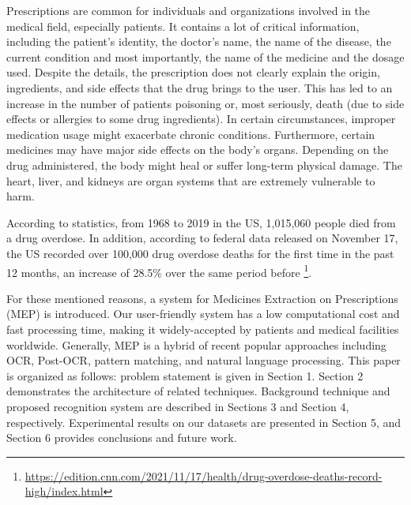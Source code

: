 Prescriptions are common for individuals and organizations involved in the medical field, especially patients. It contains a lot of critical information, including the patient's identity, the doctor's name, the name of the disease, the current condition and most importantly, the name of the medicine and the dosage used. Despite the details, the prescription does not clearly explain the origin, ingredients, and side effects that the drug brings to the user. This has led to an increase in the number of patients poisoning or, most seriously, death (due to side effects or allergies to some drug ingredients). In certain circumstances, improper medication usage might exacerbate chronic conditions. Furthermore, certain medicines may have major side effects on the body's organs. Depending on the drug administered, the body might heal or suffer long-term physical damage. The heart, liver, and kidneys are organ systems that are extremely vulnerable to harm.

According to statistics, from 1968 to 2019 in the US, 1,015,060 people died from a drug overdose. In addition, according to federal data released on November 17, the US recorded over 100,000 drug overdose deaths for the first time in the past 12 months, an increase of 28.5\% over the same period before \footnote{\url{https://edition.cnn.com/2021/11/17/health/drug-overdose-deaths-record-high/index.html}}.


For these mentioned reasons, a system for Medicines Extraction on Prescriptions (MEP) is introduced. Our user-friendly system has a low computational cost and fast processing time, making it widely-accepted by patients and medical facilities worldwide. Generally, MEP is a hybrid of recent popular approaches including OCR, Post-OCR, pattern matching, and natural language processing. This paper is organized as follows: problem statement is given in Section 1. Section 2 demonstrates the architecture of related techniques. Background technique and proposed recognition system are described in Sections 3 and Section 4, respectively. Experimental results on our datasets are presented in Section 5, and Section 6 provides conclusions and future work.

